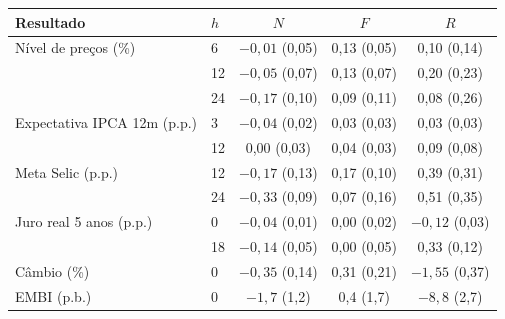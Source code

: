 \documentclass[12pt,a4paper]{article}
\begin{document}
\begin{center}
\footnotesize
\begin{tabular}{llccc}
\toprule
Resultado & \(h\) & \(N\) & \(F\) & \(R\) \\
\midrule
Nível de preços (\%) & 6 & \(-0{,}01\) (0,05) & 0,13 (0,05) & 0,10 (0,14) \\
 & 12 & \(-0{,}05\) (0,07) & 0,13 (0,07) & 0,20 (0,23) \\
 & 24 & \(-0{,}17\) (0,10) & 0,09 (0,11) & 0,08 (0,26) \\
Expectativa IPCA 12m (p.p.) & 3 & \(-0{,}04\) (0,02) & 0,03 (0,03) & 0,03 (0,03) \\
 & 12 & 0,00 (0,03) & 0,04 (0,03) & 0,09 (0,08) \\
Meta Selic (p.p.) & 12 & \(-0{,}17\) (0,13) & 0,17 (0,10) & 0,39 (0,31) \\
 & 24 & \(-0{,}33\) (0,09) & 0,07 (0,16) & 0,51 (0,35) \\
Juro real 5 anos (p.p.) & 0 & \(-0{,}04\) (0,01) & 0,00 (0,02) & \(-0{,}12\) (0,03) \\
 & 18 & \(-0{,}14\) (0,05) & 0,00 (0,05) & 0,33 (0,12) \\
Câmbio (\%) & 0 & \(-0{,}35\) (0,14) & 0,31 (0,21) & \(-1{,}55\) (0,37) \\
EMBI (p.b.) & 0 & \(-1{,}7\) (1,2) & 0,4 (1,7) & \(-8{,}8\) (2,7) \\
\bottomrule
\end{tabular}
\end{center}
\end{document}

